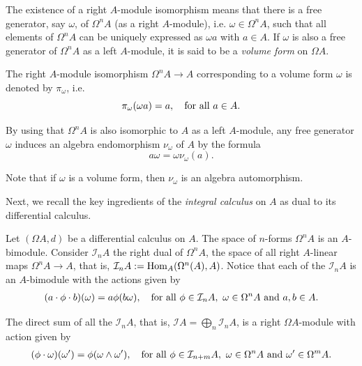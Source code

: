 \documentclass{amsart}
\theoremstyle{definition}
\theoremstyle{remark}
\numberwithin{equation}{section}
\begin{document}
The existence of a right $A$-module isomorphism means that there is a free generator, say $\omega$, of $\Omega^n A$ (as a right $A$-module), i.e. $\omega \in \Omega^n A$, such that all elements of $\Omega^n A$ can be uniquely expressed as $\omega a$ with $a \in A$. If $\omega$ is also a free generator of $\Omega^n A$ as a left $A$-module, it is said to be a {\em volume form} on $\Omega A$.

The right $A$-module isomorphism $\Omega^n A \to A$ corresponding to a volume form $\omega$ is denoted by $\pi_{\omega}$, i.e.
\begin{equation}\label{BrzezinskiSitarz2017(2.1)}
\pi_{\omega} (\omega a) = a, \quad {\rm for\ all}\ a\in A.
\end{equation}

By using that $\Omega^n A$ is also isomorphic to $A$ as a left $A$-module, any free generator $\omega $ induces an algebra endomorphism $\nu_{\omega}$ of $A$ by the formula
\begin{equation}\label{BrzezinskiSitarz2017(2.2)}
    a \omega = \omega \nu_{\omega} (a).
\end{equation}

Note that if $\omega$ is a volume form, then $\nu_{\omega}$ is an algebra automorphism.

Next, we recall the key ingredients of the {\em integral calculus} on $A$ as dual to its differential calculus. 

Let $(\Omega A, d)$ be a differential calculus on $A$. The space of $n$-forms $\Omega^n A$ is an $A$-bimodule. Consider $\mathcal{I}_{n}A$ the right dual of $\Omega^{n}A$, the space of all right $A$-linear maps $\Omega^{n}A\rightarrow A$, that is, $\mathcal{I}_{n}A := {\rm Hom}_{A}(\Omega^{n}(A),A)$. Notice that each of the $\mathcal{I}_{n}A$ is an $A$-bimodule with the actions given by
\begin{align*}
    (a\cdot\phi\cdot b)(\omega)=a\phi(b\omega),\quad {\rm for\ all}\ \phi \in \mathcal{I}_{n}A,\ \omega \in \Omega^{n}A\ {\rm and}\ a,b \in A.
\end{align*}

The direct sum of all the $\mathcal{I}_{n}A$, that is, $\mathcal{I}A = \bigoplus_{n} \mathcal{I}_n A$, is a right $\Omega A$-module with action given by
\begin{align}\label{BrzezinskiSitarz2017(2.3)}
    (\phi\cdot\omega)(\omega')=\phi(\omega\wedge\omega'),\quad {\rm for\ all}\ \phi\in\mathcal{I}_{n + m}A, \ \omega\in \Omega^{n}A \ {\rm and} \ \omega' \in \Omega^{m}A.
\end{align}
\end{document}
